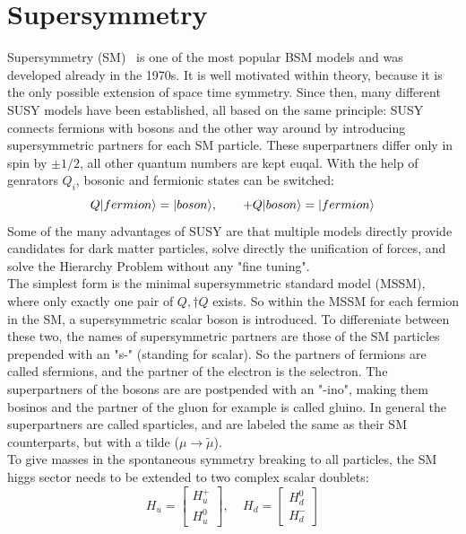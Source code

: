 \section{Supersymmetry}\label{sec:SUSY}
Supersymmetry (SM)~\cite{SUSYOriginal,SUSYPrimer} is one of the most popular BSM models and was developed already in the 1970s. It is well motivated within theory, because it is the only possible extension of space time symmetry. Since then, many different SUSY models have been established, all based on the same principle: SUSY connects fermions with bosons and the other way around by introducing supersymmetric partners for each SM particle. These superpartners differ only in spin by $\pm1/2$, all other quantum numbers are kept euqal. With the help of genrators $Q_i$, bosonic and fermionic states can be switched:
\begin{equation}
  Q\lvert fermion\rangle=\lvert boson\rangle,~~~~~~+ Q\lvert boson\rangle=\lvert fermion\rangle
\end{equation}
Some of the many advantages of SUSY are that multiple models directly provide candidates for dark matter particles, solve directly the unification of forces, and solve the Hierarchy Problem without any "fine tuning".\\
The simplest form is the minimal supersymmetric standard model (MSSM), where only exactly one pair of $Q,\dagger{Q}$ exists. So within the MSSM for each fermion in the SM, a supersymmetric scalar boson is introduced. To differeniate between these two, the names of supersymmetric partners are those of the SM particles prepended with an "s-" (standing for scalar). So the partners of fermions are called sfermions, and \eg the partner of the electron is the selectron. The superpartners of the bosons are are postpended with an "-ino", making them bosinos and the partner of the gluon for example is called gluino. In general the superpartners are called sparticles, and are labeled the same as their SM counterparts, but with a tilde ($\mu \to \tilde{\mu}$).\\
To give masses in the spontaneous symmetry breaking to all particles, the SM higgs sector needs to be extended to two complex scalar doublets:
\begin{equation}
H_u=  \left[
  \begin{matrix}
    H_u^+ \\
    H_u^0
  \end{matrix}
  \right],~~~~~
  H_d=  \left[
    \begin{matrix}
      H_d^0 \\
      H_d^-
    \end{matrix}
    \right]
\end{equation}
